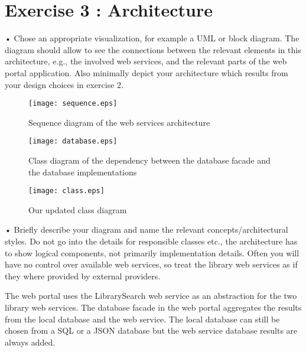 \section{Exercise 3 : Architecture}

    • Chose an appropriate visualization, for example a UML or block diagram. The
    diagram should allow to see the connections between the relevant elements in this
    architecture, e.g., the involved web services, and the relevant parts of the web
    portal application. Also minimally depict your architecture which results from
    your design choices in exercise 2.

    \begin{figure}[p]
      \texttt{[image: sequence.eps]}
      \caption{\label{fig:sequence}Sequence diagram of the web services architecture}
    \end{figure}

    \begin{figure}[p]
      \texttt{[image: database.eps]}
      \caption{\label{fig:database}Class diagram of the dependency between the database facade and the database implementations}
    \end{figure}

    \begin{figure}[p]
      \texttt{[image: class.eps]}
      \caption{\label{fig:class} Our updated class diagram}
    \end{figure}

    • Briefly describe your diagram and name the relevant concepts/architectural styles.
    Do not go into the details for responsible classes etc., the architecture has to show
    logical components, not primarily implementation details. Often you will have no
    control over available web services, so treat the library web services as if they where
    provided by external providers.

    The web portal uses the LibrarySearch web service as an abstraction for the two library web services.
    The database facade in the web portal aggregates the results from the local database and the web service. The local database can still be chosen from a SQL or a JSON database but the web service database results are always added.
